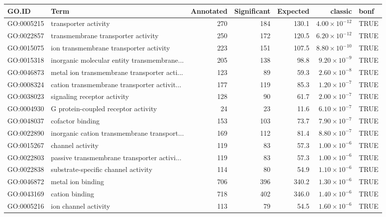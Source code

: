 \begin{table}[ht]
\centering
\begin{adjustbox}{width=\textwidth}
\begin{tabular}{llrrrrl}
  \hline
GO.ID & Term & Annotated & Significant & Expected & classic & bonf \\ 
  \hline
GO:0005215 & transporter activity & 270 & 184 & 130.1 & $4.00 \times 10^{-12}$ & TRUE \\ 
  GO:0022857 & transmembrane transporter activity & 250 & 172 & 120.5 & $6.20 \times 10^{-12}$ & TRUE \\ 
  GO:0015075 & ion transmembrane transporter activity & 223 & 151 & 107.5 & $8.80 \times 10^{-10}$ & TRUE \\ 
  GO:0015318 & inorganic molecular entity transmembrane... & 205 & 138 & 98.8 & $9.20 \times 10^{-9}$ & TRUE \\ 
  GO:0046873 & metal ion transmembrane transporter acti... & 123 & 89 & 59.3 & $2.60 \times 10^{-8}$ & TRUE \\ 
  GO:0008324 & cation transmembrane transporter activit... & 177 & 119 & 85.3 & $1.20 \times 10^{-7}$ & TRUE \\ 
  GO:0038023 & signaling receptor activity & 128 & 90 & 61.7 & $2.00 \times 10^{-7}$ & TRUE \\ 
  GO:0004930 & G protein-coupled receptor activity & 24 & 23 & 11.6 & $6.10 \times 10^{-7}$ & TRUE \\ 
  GO:0048037 & cofactor binding & 153 & 103 & 73.7 & $7.90 \times 10^{-7}$ & TRUE \\ 
  GO:0022890 & inorganic cation transmembrane transport... & 169 & 112 & 81.4 & $8.80 \times 10^{-7}$ & TRUE \\ 
  GO:0015267 & channel activity & 119 & 83 & 57.3 & $1.00 \times 10^{-6}$ & TRUE \\ 
  GO:0022803 & passive transmembrane transporter activi... & 119 & 83 & 57.3 & $1.00 \times 10^{-6}$ & TRUE \\ 
  GO:0022838 & substrate-specific channel activity & 114 & 80 & 54.9 & $1.10 \times 10^{-6}$ & TRUE \\ 
  GO:0046872 & metal ion binding & 706 & 396 & 340.2 & $1.30 \times 10^{-6}$ & TRUE \\ 
  GO:0043169 & cation binding & 718 & 402 & 346.0 & $1.40 \times 10^{-6}$ & TRUE \\ 
  GO:0005216 & ion channel activity & 113 & 79 & 54.5 & $1.60 \times 10^{-6}$ & TRUE \\ 

\end{tabular}
\end{adjustbox}
\end{table}
